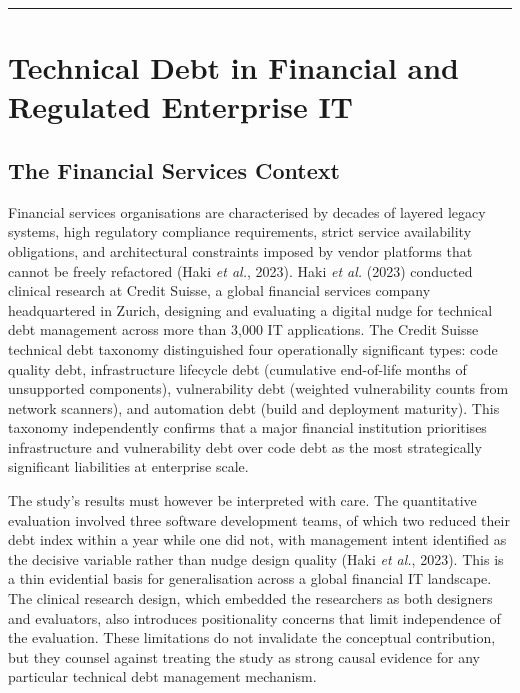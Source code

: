 \documentclass[
  british,
  12pt,
  a4paper,
]{report}
\begin{document}
\begin{center}\rule{0.5\linewidth}{0.5pt}\end{center}

\section{Technical Debt in Financial and Regulated Enterprise
IT}\label{technical-debt-in-financial-and-regulated-enterprise-it}

\subsection{The Financial Services
Context}\label{the-financial-services-context}

Financial services organisations are characterised by decades of layered
legacy systems, high regulatory compliance requirements, strict service
availability obligations, and architectural constraints imposed by
vendor platforms that cannot be freely refactored (Haki \emph{et al.},
2023). Haki \emph{et al.} (2023) conducted clinical research at Credit
Suisse, a global financial services company headquartered in Zurich,
designing and evaluating a digital nudge for technical debt management
across more than 3,000 IT applications. The Credit Suisse technical debt
taxonomy distinguished four operationally significant types: code
quality debt, infrastructure lifecycle debt (cumulative end-of-life
months of unsupported components), vulnerability debt (weighted
vulnerability counts from network scanners), and automation debt (build
and deployment maturity). This taxonomy independently confirms that a
major financial institution prioritises infrastructure and vulnerability
debt over code debt as the most strategically significant liabilities at
enterprise scale.

The study's results must however be interpreted with care. The
quantitative evaluation involved three software development teams, of
which two reduced their debt index within a year while one did not, with
management intent identified as the decisive variable rather than nudge
design quality (Haki \emph{et al.}, 2023). This is a thin evidential
basis for generalisation across a global financial IT landscape. The
clinical research design, which embedded the researchers as both
designers and evaluators, also introduces positionality concerns that
limit independence of the evaluation. These limitations do not
invalidate the conceptual contribution, but they counsel against
treating the study as strong causal evidence for any particular
technical debt management mechanism.
\end{document}
